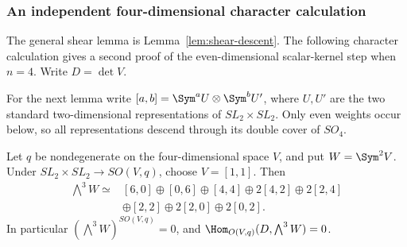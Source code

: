 \subsubsection{An independent four-dimensional character calculation}

The general shear lemma is Lemma~\ref{lem:shear-descent}.
The following character calculation gives a second proof of the
even-dimensional scalar-kernel step when \(n=4\).  Write \(D=\det V\).

For the next lemma write
\([a,b]=\Sym^a U\otimes\Sym^b U'\), where \(U,U'\)
are the two standard two-dimensional representations of
\(SL_2\times SL_2\).  Only even weights occur below, so all
representations descend through its double cover of \(SO_4\).

\begin{lemma}
\label{lem:orthogonal-exterior-cube}
Let \(q\) be nondegenerate on the four-dimensional space \(V\),
and put \(W=\Sym^2V\).  Under \(SL_2\times SL_2\to SO(V,q)\),
choose \(V=[1,1]\).  Then
\begin{equation}\label{eq:explicit-so4-exterior-cube}
\begin{split}
 \bigwedge^3 W\simeq{}&[6,0]\oplus[0,6]\oplus[4,4]
       \oplus2[4,2]\oplus2[2,4]\\
       &\oplus[2,2]\oplus2[2,0]\oplus2[0,2].
\end{split}
\end{equation}
In particular \((\bigwedge^3W)^{SO(V,q)}=0\), and
\(\Hom_{O(V,q)}(D,\bigwedge^3W)=0\).
\end{lemma}
